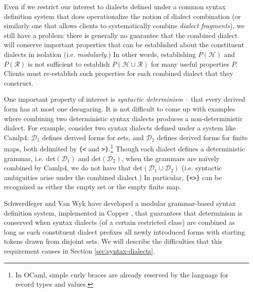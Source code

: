 Even if we restrict our interest  to dialects defined under a common syntax definition system that does operationalize the notion of dialect combination (or similarly one that allows clients to systematically combine \emph{dialect fragments}), we still have a problem: there is generally no guarantee that the combined dialect will conserve important properties that can be established about the constituent dialects in isolation (i.e. \emph{modularly}.) In other words, establishing $P(\mathcal{H})$ and $P(\mathcal{R})$ is not sufficient to establish $P(\mathcal{H} \cup \mathcal{R})$ for many useful properties $P$. Clients must re-establish such properties for each combined dialect that they construct.%

One important property of interest is \emph{syntactic determinism} -- that every derived form has at most one desugaring. It is not difficult to come up with examples where combining two deterministic syntax dialects produces a non-deterministic dialect. For example, consider two syntax dialects defined under a system like Camlp4: $\mathcal{D}_1$ defines derived forms for sets, and $\mathcal{D}_2$ defines derived forms for finite maps, both delimited by \verb~{<~ and \verb~>}~.\footnote{In OCaml, simple curly braces are already reserved by the language for record types and values.} Though each dialect defines a deterministic grammar, i.e. $\mathrm{det}(\mathcal{D}_1)$ and $\mathrm{det}(\mathcal{D}_2)$, when the grammars are na\"ively combined by Camlp4, we do not have that $\mathrm{det}(\mathcal{D}_1 \cup \mathcal{D}_2)$ (i.e. syntactic ambiguities arise under the combined dialect.) In particular, \verb~{<>}~ can be recognized as either the empty set or the empty finite map. %

Schwerdfeger and Van Wyk have developed a modular grammar-based syntax definition system, implemented in Copper \cite{conf/gpce/WykS07}, that guarantees that determinism is conserved when syntax dialects (of a certain restricted class) are combined \cite{conf/pldi/SchwerdfegerW09,schwerdfeger2010context} as long as each constituent dialect prefixes all newly introduced forms with starting tokens drawn from disjoint sets. We will describe the difficulties that this requirement causes in Section \ref{sec:syntax-dialects}.


